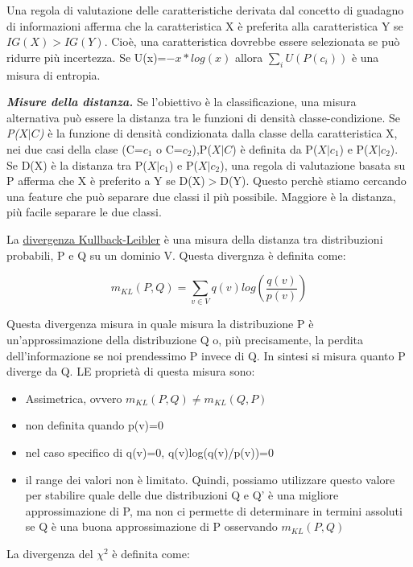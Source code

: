 \documentclass[a4paper]{extarticle}
\begin{document}
Una regola di valutazione delle caratteristiche derivata dal concetto di guadagno di informazioni afferma che la caratteristica X è preferita alla caratteristica Y se $IG(X)>IG(Y)$. Cioè, una caratteristica dovrebbe essere selezionata se può ridurre più incertezza. Se U(x)=$-x*log(x)$ allora $\sum_{i}U(P(c_i))$ è una misura di entropia.

\textbf{\textit{Misure della distanza.}} Se l'obiettivo è la classificazione, una misura alternativa può essere la distanza tra le funzioni di densità classe-condizione. Se \textit{P($X|C$)} è la funzione di densità condizionata dalla classe della caratteristica X, nei due casi della clase (C=$c_1$ o C=$c_2$),P($X|C$) è definita da P($X|c_1$) e P($X|c_2$). Se D(X) è la distanza tra P($X|c_1$) e P($X|c_2$), una regola di valutazione basata su P afferma che X è preferito a Y se D(X)$>$D(Y). Questo perchè stiamo cercando una feature che può separare due classi il più possibile. Maggiore è la distanza, più facile separare le due classi.

La \underline{divergenza Kullback-Leibler} è una misura della distanza tra distribuzioni probabili, P e Q su un dominio V. Questa divergnza è definita come:

\begin{equation}
m_{KL}(P,Q)= \sum_{v\in V} q(v)log(\frac {q(v)}{p(v)})
\end{equation}

Questa divergenza misura in quale misura la distribuzione P è un'approssimazione della distribuzione Q o, più precisamente, la perdita dell'informazione se noi prendessimo P invece di Q. In sintesi si misura quanto P diverge da Q. LE proprietà di questa misura sono:

\begin{itemize}
\item Assimetrica, ovvero $m_{KL}(P,Q) \not = m_{KL}(Q,P)$
\item non definita quando p(v)=0
\item nel caso specifico di q(v)=0, q(v)log(q(v)/p(v))=0
\item il range dei valori non è limitato. Quindi, possiamo utilizzare questo valore per stabilire quale delle due distribuzioni Q e Q' è una migliore approssimazione di P, ma non ci permette di determinare in termini assoluti se Q è una buona approssimazione di P osservando $m_{KL}(P,Q)$
\end{itemize} 

La divergenza del $\chi ^2$ è definita come:
\end{document}
